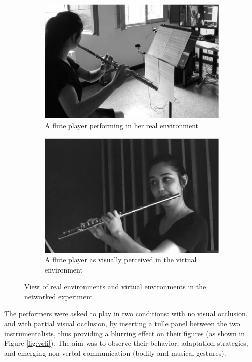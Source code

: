 \begin{figure}[t]
\begin{subfigure}[t]{.48\columnwidth}
		\includegraphics[width=\textwidth]{img/fs.eps}
		\caption{A flute player performing in her real environment}
		\label{subfig:fs}
	\end{subfigure}
	\begin{subfigure}[t]{.48\columnwidth}
		\centering        
		\includegraphics[width=\textwidth]{img/fv.eps}
		\caption{A flute player as visually perceived in the virtual environment}
		\label{subfig:fv}
	\end{subfigure}
	
	\quad 
	\caption{View of real environments and virtual environments in the networked experiment}\label{fig:afsv}
	
\end{figure}

The performers were asked to play in two conditions: with no visual occlusion, and with partial visual occlusion, by inserting a tulle panel between the two instrumentalists, thus providing a blurring effect on their figures (as shown in Figure \ref{fig:veli}). The aim was to observe their behavior, adaptation strategies, and emerging non-verbal communication (bodily and musical gestures).

